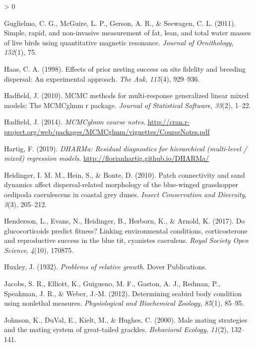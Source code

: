 \documentclass[
]{article}
\newlength{\cslhangindent}
\newenvironment{CSLReferences}[2] %
 {%
  \setlength{\parindent}{0pt}
  \ifodd #1 \everypar{\setlength{\hangindent}{\cslhangindent}}\ignorespaces\fi
  \ifnum #2 > 0
  \setlength{\parskip}{#2\baselineskip}
  \fi
 }%
 {}
\begin{document}
\begin{CSLReferences}{1}{0}
\leavevmode\hypertarget{ref-guglielmo2011simple}{}%
Guglielmo, C. G., McGuire, L. P., Gerson, A. R., \& Seewagen, C. L.
(2011). Simple, rapid, and non-invasive measurement of fat, lean, and
total water masses of live birds using quantitative magnetic resonance.
\emph{Journal of Ornithology}, \emph{152}(1), 75.

\leavevmode\hypertarget{ref-haas1998effects}{}%
Haas, C. A. (1998). Effects of prior nesting success on site fidelity
and breeding dispersal: An experimental approach. \emph{The Auk},
\emph{115}(4), 929--936.

\leavevmode\hypertarget{ref-hadfield2010mcmc}{}%
Hadfield, J. (2010). MCMC methods for multi-response generalized linear
mixed models: The MCMCglmm r package. \emph{Journal of Statistical
Software}, \emph{33}(2), 1--22.

\leavevmode\hypertarget{ref-hadfield2014coursenotes}{}%
Hadfield, J. (2014). \emph{MCMCglmm course notes}.
\url{http://cran.r-project.org/web/packages/MCMCglmm/vignettes/CourseNotes.pdf}

\leavevmode\hypertarget{ref-Hartig2019dharma}{}%
Hartig, F. (2019). \emph{DHARMa: Residual diagnostics for hierarchical
(multi-level / mixed) regression models}.
\url{http://florianhartig.github.io/DHARMa/}

\leavevmode\hypertarget{ref-heidinger2010patch}{}%
Heidinger, I. M. M., Hein, S., \& Bonte, D. (2010). Patch connectivity
and sand dynamics affect dispersal-related morphology of the blue-winged
grasshopper oedipoda caerulescens in coastal grey dunes. \emph{Insect
Conservation and Diversity}, \emph{3}(3), 205--212.

\leavevmode\hypertarget{ref-henderson2017glucocorticoids}{}%
Henderson, L., Evans, N., Heidinger, B., Herborn, K., \& Arnold, K.
(2017). Do glucocorticoids predict fitness? Linking environmental
conditions, corticosterone and reproductive success in the blue tit,
cyanistes caeruleus. \emph{Royal Society Open Science}, \emph{4}(10),
170875.

\leavevmode\hypertarget{ref-huxley1932problems}{}%
Huxley, J. (1932). \emph{Problems of relative growth}. Dover
Publications.

\leavevmode\hypertarget{ref-jacobs2012determining}{}%
Jacobs, S. R., Elliott, K., Guigueno, M. F., Gaston, A. J., Redman, P.,
Speakman, J. R., \& Weber, J.-M. (2012). Determining seabird body
condition using nonlethal measures. \emph{Physiological and Biochemical
Zoology}, \emph{85}(1), 85--95.

\leavevmode\hypertarget{ref-johnson2000male}{}%
Johnson, K., DuVal, E., Kielt, M., \& Hughes, C. (2000). Male mating
strategies and the mating system of great-tailed grackles.
\emph{Behavioral Ecology}, \emph{11}(2), 132--141.


\end{CSLReferences}
\end{document}
